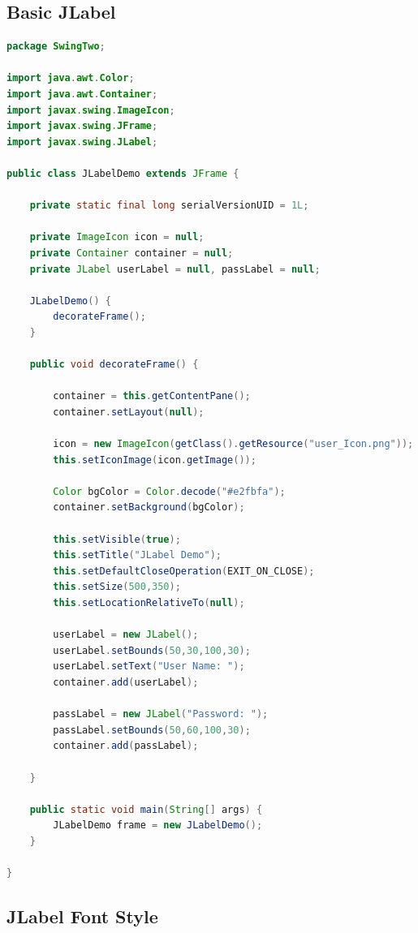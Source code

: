 \subsection{Basic JLabel}
\begin{lstlisting}[language=java]
package SwingTwo;

import java.awt.Color;
import java.awt.Container;
import javax.swing.ImageIcon;
import javax.swing.JFrame;
import javax.swing.JLabel;

public class JLabelDemo extends JFrame {

	private static final long serialVersionUID = 1L;
	
	private ImageIcon icon = null;
	private Container container = null;
	private JLabel userLabel = null, passLabel = null;
	
	JLabelDemo() {
		decorateFrame();
	}
	
	public void decorateFrame() {
		
		container = this.getContentPane();
		container.setLayout(null);
		
		icon = new ImageIcon(getClass().getResource("user_Icon.png"));
		this.setIconImage(icon.getImage());
		
		Color bgColor = Color.decode("#e2fbfa");
		container.setBackground(bgColor);
		
		this.setVisible(true);
		this.setTitle("JLabel Demo");
		this.setDefaultCloseOperation(EXIT_ON_CLOSE);
		this.setSize(500,350);
		this.setLocationRelativeTo(null);
		
		userLabel = new JLabel();
		userLabel.setBounds(50,30,100,30);
		userLabel.setText("User Name: ");
		container.add(userLabel);
		
		passLabel = new JLabel("Password: ");
		passLabel.setBounds(50,60,100,30);
		container.add(passLabel);
		
	}

	public static void main(String[] args) {
		JLabelDemo frame = new JLabelDemo();
	}

}
\end{lstlisting}

\subsection{JLabel Font Style}

